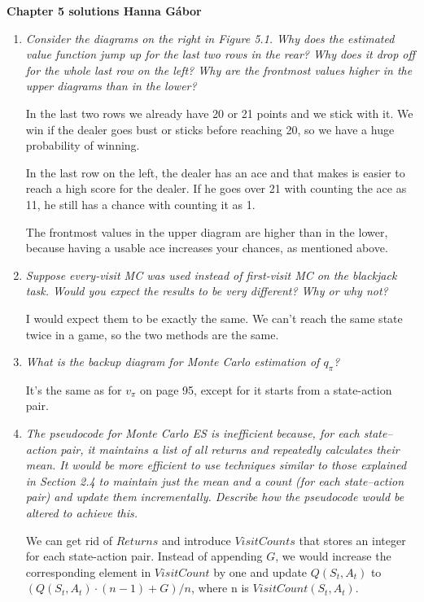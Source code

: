 \documentclass[12pt,a4paper]{article}
\begin{document}
\textbf{Chapter 5 solutions  \hfill Hanna Gábor}

\begin{enumerate}
  \item
    \textit{Consider the diagrams on the right in Figure 5.1. Why does the estimated
    value function jump up for the last two rows in the rear? Why does it drop off for the
    whole last row on the left? Why are the frontmost values higher in the upper diagrams
    than in the lower?}

    In the last two rows we already have 20 or 21 points and we stick with it. We win if
    the dealer goes bust or sticks before reaching 20, so we have a huge probability
    of winning.

    In the last row on the left, the dealer has an ace and that makes is easier to reach
    a high score for the dealer. If he goes over 21 with counting the ace as 11,
    he still has a chance with counting it as 1.

    The frontmost values in the upper diagram are higher than in the lower, because
    having a usable ace increases your chances, as mentioned above.

  \item
    \textit{Suppose every-visit MC was used instead of first-visit MC on the blackjack
      task. Would you expect the results to be very different? Why or why not?}

    I would expect them to be exactly the same. We can't reach the same state twice in a game,
    so the two methods are the same.

  \item
    \textit{What is the backup diagram for Monte Carlo estimation of $q_\pi$?}

    It's the same as for $v_\pi$ on page 95, except for it starts from a state-action pair.

  \item
    \textit{The pseudocode for Monte Carlo ES is inefficient because, for each state–action
    pair, it maintains a list of all returns and repeatedly calculates their mean. It would
    be more efficient to use techniques similar to those explained in Section 2.4 to maintain
    just the mean and a count (for each state–action pair) and update them incrementally.
    Describe how the pseudocode would be altered to achieve this.}

    We can get rid of $Returns$ and introduce $VisitCounts$ that stores an integer
    for each state-action pair. Instead of appending $G$, we would increase the
    corresponding element in $VisitCount$ by one and update $Q(S_t, A_t)$ to
    $(Q(S_t, A_t) \cdot (n - 1) + G)/ n$, where n is $VisitCount(S_t, A_t)$.


\end{enumerate}
\end{document}

